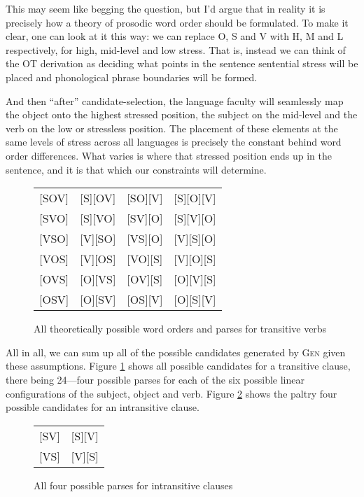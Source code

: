 \documentclass{article}
\begin{document}
This may seem like begging the question, but I'd argue that in reality it is precisely how a theory of prosodic word order should be formulated.
To make it clear, one can look at it this way: we can replace O, S and V with H, M and L respectively, for high, mid-level and low stress.
That is, instead we can think of the OT derivation as deciding what points in the sentence sentential stress will be placed and phonological phrase boundaries will be formed.

And then ``after'' candidate-selection, the language faculty will seamlessly map the object onto the highest stressed position, the subject on the mid-level and the verb on the low or stressless position.
The placement of these elements at the same levels of stress across all languages is precisely the constant behind word order differences.
What varies is where that stressed position ends up in the sentence, and it is that which our constraints will determine.

\begin{figure}
	\begin{center}
	\begin{tabular}{cccc}
		{}[SOV]&[S][OV]&[SO][V]&[S][O][V]\\
		{}[SVO]&[S][VO]&[SV][O]&[S][V][O]\\
		{}[VSO]&[V][SO]&[VS][O]&[V][S][O]\\
		{}[VOS]&[V][OS]&[VO][S]&[V][O][S]\\
		{}[OVS]&[O][VS]&[OV][S]&[O][V][S]\\
		{}[OSV]&[O][SV]&[OS][V]&[O][S][V]\\
	\end{tabular}
	\end{center}
	\caption{All theoretically possible word orders and parses for transitive verbs\label{allcand}}
\end{figure}

All in all, we can sum up all of the possible candidates generated by \textsc{Gen} given these assumptions.
Figure \ref{allcand} shows all possible candidates for a transitive clause, there being 24---four possible parses for each of the six possible linear configurations of the subject, object and verb.
Figure \ref{instrans} shows the paltry four possible candidates for an intransitive clause.

\begin{figure}
	\begin{center}
		\begin{tabular}{cc}
			{}[SV]&[S][V]\\
			{}[VS]&[V][S]\\
		\end{tabular}
	\end{center}
	\caption{All four possible parses for intransitive clauses\label{instrans}}
\end{figure}
\end{document}
